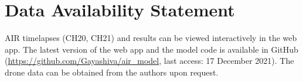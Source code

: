 \documentclass[utf8]{frontiersSCNS}
\begin{document}
\section*{Data Availability Statement} AIR timelapses (CH20, CH21) and results can be viewed interactively in
the web app.  The latest version of the web app and the model code  is available in GitHub
(\url{https://github.com/Gayashiva/air_model}, last access: 17 December 2021). The drone data can be obtained from
the authors upon request.

 
\end{document}
